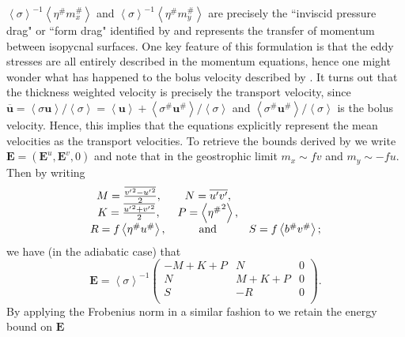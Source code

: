\documentclass[10pt,a4paper]{article}
\newcommand*\thkmean[1]{\overline{#1}}
\newcommand*\thkres[1]{{#1}^{\prime}}
\newcommand*\nthkmean[1]{\left\langle{#1}\right\rangle}
\newcommand*\nthkres[1]{{#1}^{\#}}
\begin{document}
                   $ \nthkmean{\sigma}^{-1}\nthkmean{\nthkres{\eta}\nthkres{m}_{x}}$ and 
                   $\nthkmean{\sigma}^{-1}\nthkmean{\nthkres{\eta}\nthkres{m}_{y}}$ are
                   precisely the ``inviscid pressure drag"  or ``form drag" identified
                   by \cite{rhines1979theoretical} and represents the transfer of momentum
                   between isopycnal surfaces. One key feature of this formulation
                   is that the eddy stresses are all entirely described in the momentum
                   equations, hence one might wonder what has happened to 
                   the bolus velocity described by \cite{gent1995parameterizing}. 
                   It turns out that the thickness weighted velocity is precisely 
                   the transport velocity, since $\thkmean{\boldsymbol{u}}=\nthkmean{\sigma\boldsymbol{u}}/\nthkmean{\sigma}=\nthkmean{\boldsymbol{u}} + \nthkmean{\nthkres{\sigma}\nthkres{\boldsymbol{u}}}/\nthkmean{\sigma}$
                   and  $\nthkmean{\nthkres{\sigma}\nthkres{\boldsymbol{u}}}/\nthkmean{\sigma}$
                   is the bolus velocity. Hence, this implies that  the equations explicitly
                    represent the mean velocities as the  transport velocities.
                     To retrieve the bounds derived by \cite{marshall2012framework} 
                     we write $\boldsymbol{E} = (\boldsymbol{E}^{u}, \boldsymbol{E}^{v}, 0)$
                     and note that in the geostrophic limit $m_x \sim fv$ and  $m_y \sim -fu$.
                     Then by writing 
                     \begin{equation}
                     \begin{array}{ccc}
                     M = \frac{\thkmean{{\thkres{v}}^{2} - {\thkres{u}}^{2}}}{2}, & 
                     N = \thkmean{\thkres{u}\thkres{v} }, \\
                     K = \frac{\thkmean{{\thkres{u}}^{2} + {\thkres{v}}^{2}}}{2}, & 
                     P =  \nthkmean{{\nthkres{\eta}}^{2}},  \\ 
                     R =  f\nthkmean{\nthkres{\eta}\nthkres{u}}, \, & \rm and  &  
                     S = f\nthkmean{\nthkres{b}\nthkres{v}} ;
                     \end{array} 
                     \end{equation}
                     we have (in the adiabatic case) that
                     \begin{equation}
                     \boldsymbol{E}=\nthkmean{\sigma}^{-1}\left(
                     \begin{array}{ccc}
                     -M+K+P & N & 0 \\
                     N & M+K+P & 0 \\
                     S & -R & 0 \\
                     \end{array}\right).
                     \end{equation}
                     By applying the Frobenius norm in a similar fashion to 
                     \cite{marshall2012framework} we retain the energy bound on
                      $\boldsymbol{E}$
                      
\end{document}
